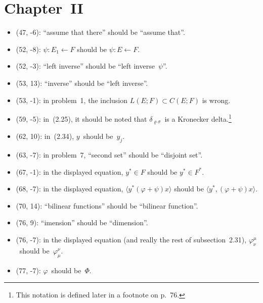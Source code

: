 \documentclass[letterpaper,12pt]{article}
\newcommand{\from}{\leftarrow}
\newcommand{\sprod}[2]{\langle#1,#2\rangle}
\begin{document}
\section*{Chapter~II}
\begin{itemize}
\item (47, -6): ``assume that there'' should be ``assume that''.
\item (52, -8): \(\psi:E_1\from F\) should be \(\psi:E\from F\).
\item (52, -3): ``left inverse'' should be ``left inverse~\(\psi\)''.
\item (53, 13): ``inverse'' should be ``left inverse''.
\item (53, -1): in problem~1, the inclusion \(L(E;F)\subset C(E;F)\) is wrong.
\item (59, -5): in~(2.25), it should be noted that \(\delta_{\varrho\sigma}\)~is a Kronecker delta.\footnote{This notation is defined later in a footnote on p.~76.}
\item (62, 10): in~(2.34), \(y\)~should be~\(y_j\).
\item (63, -7): in problem~7, ``second set'' should be ``disjoint set''.
\item (67, -1): in the displayed equation, \(y^*\in F\) should be \(y^*\in F^*\).
\item (68, -7): in the displayed equation, \(\langle y^*(\varphi+\psi)x\rangle\) should be \(\sprod{y^*}{(\varphi+\psi)x}\).
\item (70, 14): ``bilinear functions'' should be ``bilinear function''.
\item (76, 9): ``imension'' should be ``dimension''.
\item (76, -7): in the displayed equation (and really the rest of subsection~2.31), \(\varphi^{\mu}_{\nu}\)~should be~\(\varphi^{\nu}_{\mu}\).
\item (77, -7): \(\varphi\)~should be~\(\Phi\).
\end{itemize}
\end{document}
